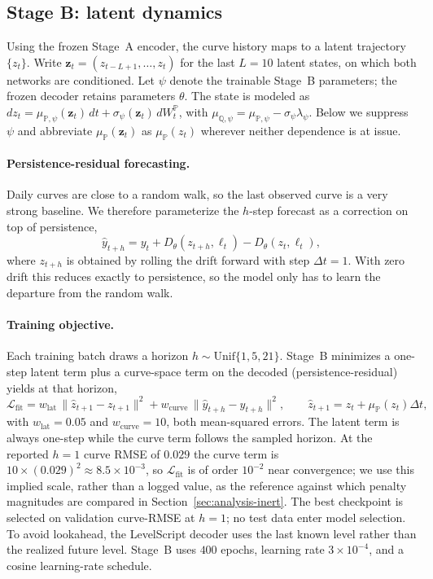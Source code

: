 \documentclass{article} %
\begin{document}
\subsection{Stage B: latent dynamics}
\label{subsec:stageB}
Using the frozen Stage~A encoder, the curve history maps to a latent trajectory
$\{z_t\}$. Write $\mathbf{z}_t=(z_{t-L+1},\dots,z_t)$ for the last $L=10$ latent
states, on which both networks are conditioned. Let $\psi$ denote the trainable
Stage~B parameters; the frozen decoder retains parameters $\theta$. The state is
modeled as
$dz_t=\mu_{\mathbb{P},\psi}(\mathbf{z}_t)\,dt+
\sigma_\psi(\mathbf{z}_t)\,dW_t^{\mathbb{P}}$,
with $\mu_{\mathbb{Q},\psi}=\mu_{\mathbb{P},\psi}-\sigma_\psi\lambda_\psi$.
Below we suppress $\psi$ and abbreviate $\mu_{\mathbb{P}}(\mathbf{z}_t)$ as
$\mu_{\mathbb{P}}(z_t)$ wherever neither dependence is at issue.
\paragraph{Persistence-residual forecasting.} Daily curves are close to a random
walk, so the last observed curve is a very strong baseline. We therefore
parameterize the $h$-step forecast as a correction on top of persistence,
\begin{equation}
  \hat{y}_{t+h} = y_t + D_\theta(z_{t+h},\ell_t) - D_\theta(z_t,\ell_t),
  \label{eq:persres}
\end{equation}
where $z_{t+h}$ is obtained by rolling the drift forward with step $\Delta t = 1$.
With zero drift this reduces exactly to persistence, so the model only has to learn
the departure from the random walk.
\paragraph{Training objective.} Each training batch draws a horizon
$h\sim\mathrm{Unif}\{1,5,21\}$. Stage~B minimizes a one-step latent term plus a
curve-space term on the decoded (persistence-residual) yields at that horizon,
\begin{equation}
  \mathcal{L}_{\mathrm{fit}}
  = w_{\mathrm{lat}}\,\big\|\hat{z}_{t+1}-z_{t+1}\big\|^2
  + w_{\mathrm{curve}}\,\big\|\hat{y}_{t+h}-y_{t+h}\big\|^2,
  \qquad \hat{z}_{t+1}=z_t+\mu_{\mathbb{P}}(z_t)\Delta t,
\end{equation}
with $w_{\mathrm{lat}}=0.05$ and $w_{\mathrm{curve}}=10$, both mean-squared errors.
The latent term is always one-step while the curve term follows the sampled horizon.
At the reported $h{=}1$ curve RMSE of $0.029$ the curve term is
$10\times(0.029)^2\approx 8.5\times10^{-3}$, so $\mathcal{L}_{\mathrm{fit}}$ is of
order $10^{-2}$ near convergence; we use this implied scale, rather than a logged
value, as the reference against which penalty magnitudes are compared in
Section~\ref{sec:analysis-inert}.
The best checkpoint is selected on validation curve-RMSE at $h{=}1$; no test data
enter model selection. To avoid lookahead, the LevelScript decoder uses the last
known level rather than the realized future level. Stage~B uses $400$ epochs,
learning rate $3\times10^{-4}$, and a cosine learning-rate schedule.
\end{document}
